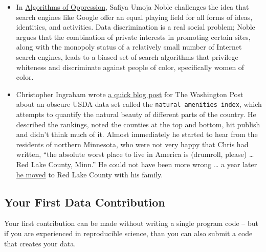\documentclass[
  a4paper,
  openany, a4paper, oneside]{book}
\begin{document}
\begin{itemize}
\item
  In \href{https://nyupress.org/9781479837243/algorithms-of-oppression/}{Algorithms of Oppression}, Safiya Umoja Noble challenges the idea that search engines like Google offer an equal playing field for all forms of ideas, identities, and activities. Data discrimination is a real social problem; Noble argues that the combination of private interests in promoting certain sites, along with the monopoly status of a relatively small number of Internet search engines, leads to a biased set of search algorithms that privilege whiteness and discriminate against people of color, specifically women of color.
\item
  Christopher Ingraham wrote \href{https://www.washingtonpost.com/gdpr-consent/?next_url=https\%3a\%2f\%2fwww.washingtonpost.com\%2fnews\%2fwonk\%2fwp\%2f2015\%2f08\%2f17\%2fevery-county-in-america-ranked-by-natural-beauty\%2f}{a quick blog post} for The Washington Post about an obscure USDA data set called the \texttt{natural\ amenities\ index}, which attempts to quantify the natural beauty of different parts of the country. He described the rankings, noted the counties at the top and bottom, hit publish and didn't think much of it. Almost immediately he started to hear from the residents of northern Minnesota, who were not very happy that Chris had written, ``the absolute worst place to live in America is (drumroll, please) \ldots{} Red Lake County, Minn.'' He could not have been more wrong \ldots{} a year later \href{https://fivethirtyeight.com/features/he-called-it-americas-worst-place-to-live-now-hes-moving-there/}{he moved} to Red Lake County with his family.
\end{itemize}

\hypertarget{first-contribution}{%
\subsection{Your First Data Contribution}\label{first-contribution}}

Your first contribution can be made without writing a single program code -- but if you are experienced in reproducible science, than you can also submit a code that creates your data.
\end{document}
